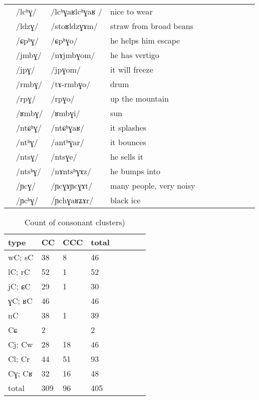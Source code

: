 \documentclass[oldfontcommands,oneside,a4paper,11pt]{article}
\newcommand{\ipa}[1]{/#1/} %
\newcommand{\trois}[1]{/#1/}
\newcommand{\idph}[1]{\cellcolor{gray}\textbf{#1}}
\begin{document}
\begin{table}
{\begin{tabular}{l|lll|lll|lll|l}
\midrule						
	&\trois{lcʰɣ} \idph{} 	&\ipa{lcʰɣaʁlcʰɣaʁ }  	&nice to wear	&	&	&\\
	&\trois{ldzɣ}  	&\ipa{stoʁldzɣɤm}  	&straw from broad beans 	&	&	&\\
\midrule						
	&\trois{ɕpʰɣ}  	&\ipa{ɕpʰɣo}  	&he helps him escape	&	&	&\\
\midrule						
	&\trois{jmbɣ}  	&\ipa{nɤjmbɣom}  	&he has vertigo	&	&	&\\
	&\trois{jpɣ}  	&\ipa{jpɣom}  	&it will freeze	&	&	&\\
\midrule						
 	&\trois{rmbɣ}  	&\ipa{tɤ-rmbɣo}  	&drum	&	&	&\\
	&\trois{rpɣ}  	&\ipa{rpɣo}  	&up the mountain	&	&	&\\
\midrule						
	&\trois{ʁmbɣ}  	&\ipa{ʁmbɣi}  	&sun	&	&	&\\
\midrule						
	&\trois{ntɕʰɣ}  	&\ipa{ntɕʰɣaʁ}  	&it splashes	&	&	&\\
	&\trois{ntʰɣ}  	&\ipa{antʰɣar}  	&it bounces	&	&	&\\
	&\trois{ntsɣ}  	&\ipa{ntsɣe}  	&he sells it	&	&	&\\
	&\trois{ntsʰɣ}  	&\ipa{nɤntsʰɣɤz}  	&he bumps into	&	&	&\\
	&\trois{ɲcɣ}\idph{}  	&\ipa{ɲcɣɤɲcɣɤt}  	&many people, very noisy	&	&	&\\
	&\trois{ɲcʰɣ}  	&\ipa{ɲchɣaʁʑɤr}  	&black ice	&	&	&\\
\end{tabular}}
\end{table}	
						
		   \begin{table}
 \caption{Count of consonant clusters)} \label{tab:clusters.tot}  \centering
\begin{tabular}{llllllll}
\toprule		
type &CC& CCC& total\\		
\midrule
wC; sC  & 	38  & 	8  & 	46  & 	\\	
lC; rC  & 	52  & 	1  & 	52  & 	\\	
jC; ɕC  & 	29  & 	1  & 	30  & 	\\	
ɣC; ʁC  & 	46  & 	  & 	46  & 	\\	
nC  & 	38  & 	1  & 	39  & 	\\	
\midrule
Cɕ  & 	2  & 	  & 	  2& 	\\	
\midrule
Cj; Cw  & 	28  & 	18  & 	46  & 	\\	
Cl; Cr  & 	44  & 	51  & 	93  & 	\\	
Cɣ; Cʁ  & 	32  & 	16  & 	48  & 	\\	
\midrule
total  & 	309  & 	96  & 	405  & 	\\	
\bottomrule
\end{tabular}
\end{table}
 
\end{document}
